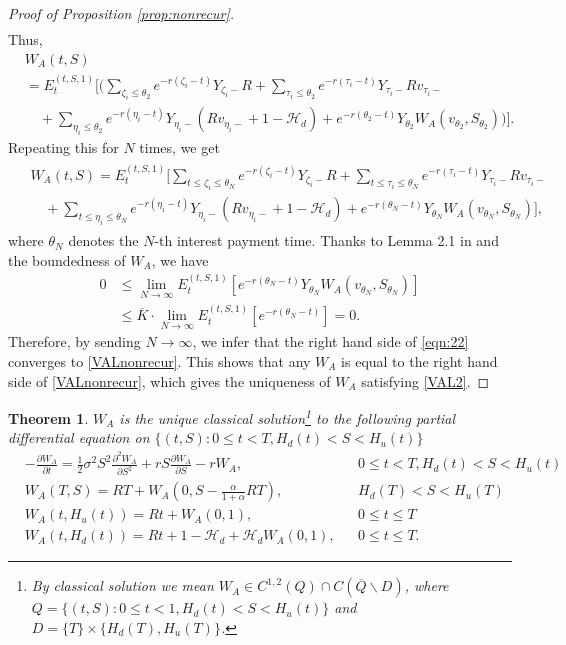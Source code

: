 \documentclass[draft, noinfoline]{ectaart}
\numberwithin{equation}{section}
\theoremstyle{plain}
\newtheorem{theorem}{Theorem}[section]
\begin{document}
\begin{appendices}
\begin{proof}[Proof of Proposition \ref{prop:nonrecur}]
\begin{align*}
	\end{align*}
	Thus,
	\begin{align*}
	&W_A(t,S) \\
	&=E_t^{(t,S,1)}\Bigg[\Bigg(\sum_{\zeta_i\le\theta_2}e^{-r(\zeta_i-t)}Y_{\zeta_i-}R+\sum_{\tau_i\le\theta_2}e^{-r(\tau_i-t)}Y_{\tau_i-}Rv_{\tau_i-}\\
	&\quad+\sum_{\eta_i\le\theta_2}e^{-r(\eta_i-t)}Y_{\eta_i-}(Rv_{\eta_i-}+1-\mathcal{H}_d)+e^{-r(\theta_2-t)}Y_{\theta_2} W_A(v_{\theta_2},S_{\theta_2})\Bigg)\Bigg].
	\end{align*}
	Repeating this for $N$ times, we get
	\begin{align}\label{eqn:22}
	\begin{split}
	&W_A(t,S)=E_t^{(t,S,1)}\Bigg[\sum_{t\le \zeta_i\le\theta_N}e^{-r(\zeta_i-t)}Y_{\zeta_i-}R+\sum_{t\le \tau_i\le \theta_N}e^{-r(\tau_i-t)}Y_{\tau_i-}Rv_{\tau_i-}\\
	&\quad+\sum_{t\le\eta_i\le \theta_N}e^{-r(\eta_i-t)}Y_{\eta_i-}(Rv_{\eta_i-}+1-\mathcal{H}_d)+e^{-r(\theta_N-t)}Y_{\theta_N}W_A(v_{\theta_N},S_{\theta_N})\Bigg],
	\end{split}
	\end{align}
	where $\theta_N$ denotes the $N$-th interest payment time. Thanks to Lemma 2.1 in \cite{dai_stochastic_2017} and the boundedness of $W_A$, we have
	\begin{align*}
	0&\le \lim_{N\to\infty}E_t^{(t,S,1)}\left[e^{-r(\theta_N-t)}Y_{\theta_N}W_A(v_{\theta_N},S_{\theta_N})\right] \\
	&\le \overline{K}\cdot\lim_{N\to\infty}E_t^{(t,S,1)}\left[e^{-r(\theta_N-t)}\right]=0.
	\end{align*}
	Therefore, by sending $N\to\infty$, we infer that the right hand side of \eqref{eqn:22} converges to \eqref{VALnonrecur}. This shows that any $W_A$ is equal to the right hand side of \eqref{VALnonrecur}, which gives the uniqueness of $W_A$ satisfying \eqref{VAL2}.
\end{proof}


\begin{theorem}\label{thm:main}
$W_{A}$ is the unique classical solution\footnote{By classical solution we mean $W_{A}\in C^{1,2}(Q)\cap C(\overline{Q}\backslash D)$, where $Q=\{(t,S):0\le t<1,H_{d}(t)<S<H_{u}(t)\}$ and $D=\{T\}\times\{H_{d}(T),H_{u}(T)\}$.} to the following partial differential equation on $\{(t,S):0\le t<T,H_{d}(t)<S<H_{u}(t)\}$
\begin{align}
&-\frac{\partial W_{A}}{\partial t}  =\frac{1}{2}\sigma^{2}S^{2}\frac{\partial^{2}W_{A}}{\partial S^{2}}+r S\frac{\partial W_{A}}{\partial S}-r W_{A},&&0\le t<T,H_d(t)<S<H_u(t)\\
&W_{A}(T,S)  =RT+W_{A}(0,S-\frac{\alpha}{1+\alpha}RT),&&H_d(T)<S<H_u(T)\\
&W_{A}(t,H_{u}(t))  =Rt+W_{A}(0,1),&&0\le t\le T\\
&W_{A}(t,H_d(t))  =Rt+1-\mathcal{H}_{d}+\mathcal{H}_{d}W_{A}(0,1),&&0\le t\le T.
\end{align}
\end{theorem}


\end{appendices}
\end{document}
